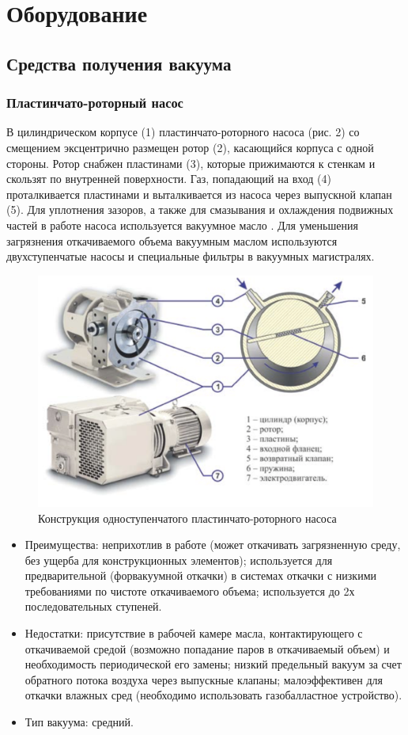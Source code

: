 \documentclass[a4paper,12pt]{article}
\theoremstyle{plain} %
\theoremstyle{definition} %
\theoremstyle{remark} %
\begin{document}
\section{Оборудование}
\subsection{Средства получения вакуума}
\subsubsection{Пластинчато-роторный насос}
В цилиндрическом корпусе (1) пластинчато-роторного насоса (рис. 2) со смещением эксцентрично размещен ротор (2), касающийся корпуса с одной стороны. Ротор снабжен пластинами (3), которые прижимаются к стенкам и скользят по внутренней поверхности. Газ, попадающий на вход (4) проталкивается пластинами и выталкивается из насоса через выпускной клапан (5). Для уплотнения зазоров, а также для смазывания и охлаждения подвижных частей в работе насоса используется вакуумное масло . Для уменьшения загрязнения откачиваемого объема вакуумным маслом используются двухступенчатые насосы и специальные фильтры в вакуумных магистралях.
\begin{figure}[H]
	\begin{center}
	\includegraphics[width=0.6\linewidth]{2}
	\caption{Конструкция одноступенчатого пластинчато-роторного насоса}
	\end{center}
\end{figure}
\begin{itemize}
	\item Преимущества: неприхотлив в работе (может откачивать загрязненную среду, без ущерба для конструкционных элементов); используется для предварительной (форвакуумной откачки) в системах откачки с низкими требованиями по чистоте откачиваемого объема; используется до 2х последовательных ступеней.
	\item Недостатки: присутствие в рабочей камере масла, контактирующего с откачиваемой средой (возможно попадание паров в откачиваемый объем) и необходимость периодической его замены; низкий предельный вакуум за счет обратного потока воздуха через выпускные клапаны; малоэффективен для откачки влажных сред (необходимо использовать газобалластное устройство).
	\item Тип вакуума: средний.
\end{itemize}
\end{document}
